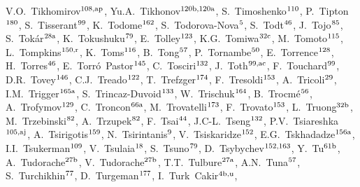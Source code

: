 \begin{flushleft}
V.O.~Tikhomirov$^\textrm{\scriptsize 108,ap}$,    
Yu.A.~Tikhonov$^\textrm{\scriptsize 120b,120a}$,    
S.~Timoshenko$^\textrm{\scriptsize 110}$,    
P.~Tipton$^\textrm{\scriptsize 180}$,    
S.~Tisserant$^\textrm{\scriptsize 99}$,    
K.~Todome$^\textrm{\scriptsize 162}$,    
S.~Todorova-Nova$^\textrm{\scriptsize 5}$,    
S.~Todt$^\textrm{\scriptsize 46}$,    
J.~Tojo$^\textrm{\scriptsize 85}$,    
S.~Tok\'ar$^\textrm{\scriptsize 28a}$,    
K.~Tokushuku$^\textrm{\scriptsize 79}$,    
E.~Tolley$^\textrm{\scriptsize 123}$,    
K.G.~Tomiwa$^\textrm{\scriptsize 32c}$,    
M.~Tomoto$^\textrm{\scriptsize 115}$,    
L.~Tompkins$^\textrm{\scriptsize 150,r}$,    
K.~Toms$^\textrm{\scriptsize 116}$,    
B.~Tong$^\textrm{\scriptsize 57}$,    
P.~Tornambe$^\textrm{\scriptsize 50}$,    
E.~Torrence$^\textrm{\scriptsize 128}$,    
H.~Torres$^\textrm{\scriptsize 46}$,    
E.~Torr\'o~Pastor$^\textrm{\scriptsize 145}$,    
C.~Tosciri$^\textrm{\scriptsize 132}$,    
J.~Toth$^\textrm{\scriptsize 99,ac}$,    
F.~Touchard$^\textrm{\scriptsize 99}$,    
D.R.~Tovey$^\textrm{\scriptsize 146}$,    
C.J.~Treado$^\textrm{\scriptsize 122}$,    
T.~Trefzger$^\textrm{\scriptsize 174}$,    
F.~Tresoldi$^\textrm{\scriptsize 153}$,    
A.~Tricoli$^\textrm{\scriptsize 29}$,    
I.M.~Trigger$^\textrm{\scriptsize 165a}$,    
S.~Trincaz-Duvoid$^\textrm{\scriptsize 133}$,    
W.~Trischuk$^\textrm{\scriptsize 164}$,    
B.~Trocm\'e$^\textrm{\scriptsize 56}$,    
A.~Trofymov$^\textrm{\scriptsize 129}$,    
C.~Troncon$^\textrm{\scriptsize 66a}$,    
M.~Trovatelli$^\textrm{\scriptsize 173}$,    
F.~Trovato$^\textrm{\scriptsize 153}$,    
L.~Truong$^\textrm{\scriptsize 32b}$,    
M.~Trzebinski$^\textrm{\scriptsize 82}$,    
A.~Trzupek$^\textrm{\scriptsize 82}$,    
F.~Tsai$^\textrm{\scriptsize 44}$,    
J.C-L.~Tseng$^\textrm{\scriptsize 132}$,    
P.V.~Tsiareshka$^\textrm{\scriptsize 105,aj}$,    
A.~Tsirigotis$^\textrm{\scriptsize 159}$,    
N.~Tsirintanis$^\textrm{\scriptsize 9}$,    
V.~Tsiskaridze$^\textrm{\scriptsize 152}$,    
E.G.~Tskhadadze$^\textrm{\scriptsize 156a}$,    
I.I.~Tsukerman$^\textrm{\scriptsize 109}$,    
V.~Tsulaia$^\textrm{\scriptsize 18}$,    
S.~Tsuno$^\textrm{\scriptsize 79}$,    
D.~Tsybychev$^\textrm{\scriptsize 152,163}$,    
Y.~Tu$^\textrm{\scriptsize 61b}$,    
A.~Tudorache$^\textrm{\scriptsize 27b}$,    
V.~Tudorache$^\textrm{\scriptsize 27b}$,    
T.T.~Tulbure$^\textrm{\scriptsize 27a}$,    
A.N.~Tuna$^\textrm{\scriptsize 57}$,    
S.~Turchikhin$^\textrm{\scriptsize 77}$,    
D.~Turgeman$^\textrm{\scriptsize 177}$,    
I.~Turk~Cakir$^\textrm{\scriptsize 4b,u}$,    

\end{flushleft}
